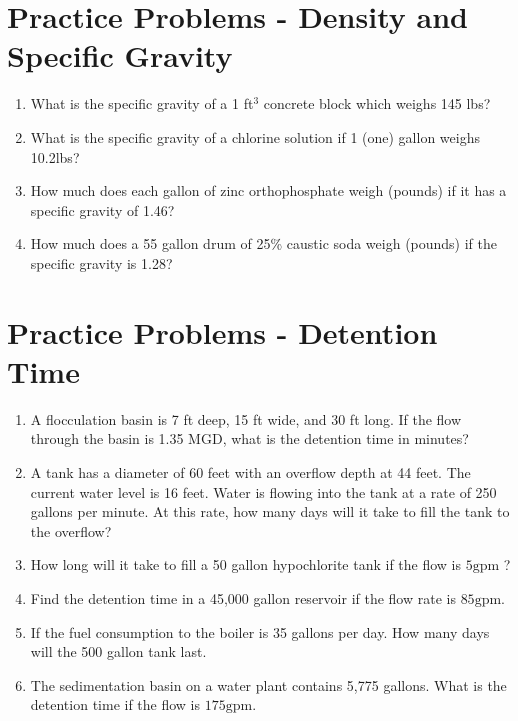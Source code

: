 \vspace{1cm}
\section*{Practice Problems - Density and Specific Gravity}
\begin{enumerate}

\item What is the specific gravity of a 1 ft$^3$ concrete block which weighs 145 lbs?

\item What is the specific gravity of a chlorine solution if 1 (one) gallon weighs 10.2lbs?

\item How much does each gallon of zinc orthophosphate weigh (pounds) if it has a specific gravity of 1.46?

\item How much does a 55 gallon drum of 25\% caustic soda weigh (pounds) if the specific gravity is 1.28?

\end{enumerate}

\section*{Practice Problems - Detention Time}
\begin{enumerate}
\item A flocculation basin is 7 ft deep, 15 ft wide, and 30 ft long. If the flow through the basin is 1.35 MGD, what is the detention time in minutes?

\item A tank has a diameter of 60 feet with an overflow depth at 44 feet. The current water level is 16 feet. Water is flowing into the tank at a rate of 250 gallons per minute. At this rate, how many days will it take to fill the tank to the overflow?

\item How long will it take to fill a 50 gallon hypochlorite tank if the flow is $5 \mathrm{gpm}$ ?

\item Find the detention time in a 45,000 gallon reservoir if the flow rate is $85 \mathrm{gpm}$.

\item If the fuel consumption to the boiler is 35 gallons per day. How many days will the 500 gallon tank last.

\item The sedimentation basin on a water plant contains 5,775 gallons. What is the detention time if the flow is $175 \mathrm{gpm}$.
\end{enumerate}

